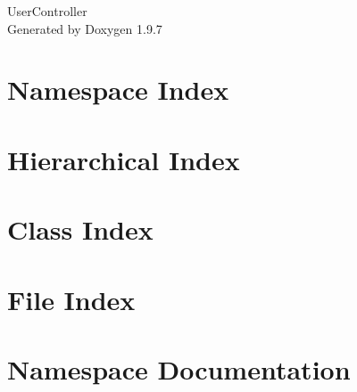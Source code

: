 \documentclass[twoside]{book}
\newcommand{\+}{\discretionary{\mbox{\scriptsize$\hookleftarrow$}}{}{}}
\newcommand{\clearemptydoublepage}{%
    \newpage{\pagestyle{empty}\cleardoublepage}%
  }
\begin{document}
  \raggedbottom
    \hypersetup{pageanchor=false,
                bookmarksnumbered=true,
                pdfencoding=unicode
               }
  \begin{titlepage}
  \vspace*{7cm}
  \begin{center}%
  {\Large User\+Controller}\\
  \vspace*{1cm}
  {\large Generated by Doxygen 1.9.7}\\
  \end{center}
  \end{titlepage}
  \clearemptydoublepage
  \tableofcontents
  \clearemptydoublepage
  \hypersetup{pageanchor=true}
\chapter{Namespace Index}

\chapter{Hierarchical Index}

\chapter{Class Index}

\chapter{File Index}

\chapter{Namespace Documentation}


















\end{document}
